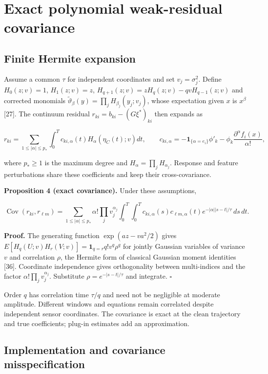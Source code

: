 \documentclass[ejs]{imsart}
\begin{document}
\section{Exact polynomial weak-residual
covariance}\label{exact-polynomial-weak-residual-covariance}

\subsection{Finite Hermite
expansion}\label{finite-hermite-expansion}

Assume a common \(\tau\) for independent coordinates and set
\(v_j=\sigma_j^2\). Define \(H_0(z;v)=1\), \(H_1(z;v)=z\),
\(H_{q+1}(z;v)=zH_q(z;v)-qvH_{q-1}(z;v)\) and corrected monomials
\(\widetilde\vartheta_\beta(y)=\prod_jH_{\beta_j}(y_j;v_j)\), whose
expectation given \(x\) is \(x^\beta\) {[}27{]}. The continuum residual
\(r_{ki}=b_{ki}-(G\xi^*)_{ki}\) then expands as

\[
r_{ki}=\sum_{1\leq|\alpha|\leq p_*}\int_0^Tc_{ki,\alpha}(t)H_\alpha(\eta_C(t);v)dt,
\qquad
c_{ki,\alpha}=-\mathbf1_{\{\alpha=e_i\}}\phi'_k
-\phi_k\frac{\partial^\alpha f_i(x)}{\alpha!},
\]

where \(p_*\geq1\) is the maximum degree and
\(H_\alpha=\prod_jH_{\alpha_j}\). Response and feature perturbations
share these coefficients and keep their cross-covariance.

\textbf{Proposition 4 (exact covariance).} Under these assumptions,

\[
\operatorname{Cov}(r_{ki},r_{\ell m})=
\sum_{1\leq|\alpha|\leq p_*}\alpha!\prod_jv_j^{\alpha_j}
\int_0^T\int_0^Tc_{ki,\alpha}(s)c_{\ell m,\alpha}(t)
e^{-|\alpha||s-t|/\tau}\,ds\,dt.
\]

\textbf{Proof.} The generating function \(\exp(az-va^2/2)\) gives
\(E[H_q(U;v)H_r(V;v)]=\mathbf1_{q=r}q!v^q\rho^q\) for jointly Gaussian
variables of variance \(v\) and correlation \(\rho\), the Hermite form
of classical Gaussian moment identities {[}36{]}. Coordinate
independence gives orthogonality between multi-indices and the factor
\(\alpha!\prod_jv_j^{\alpha_j}\). Substitute \(\rho=e^{-|s-t|/\tau}\)
and integrate. \(\square\)

Order \(q\) has correlation time \(\tau/q\) and need not be negligible
at moderate amplitude. Different windows and equations remain correlated
despite independent sensor coordinates. The covariance is exact at the
clean trajectory and true coefficients; plug-in estimates add an
approximation.

\subsection{Implementation and covariance
misspecification}\label{implementation-and-covariance-misspecification}
\end{document}
